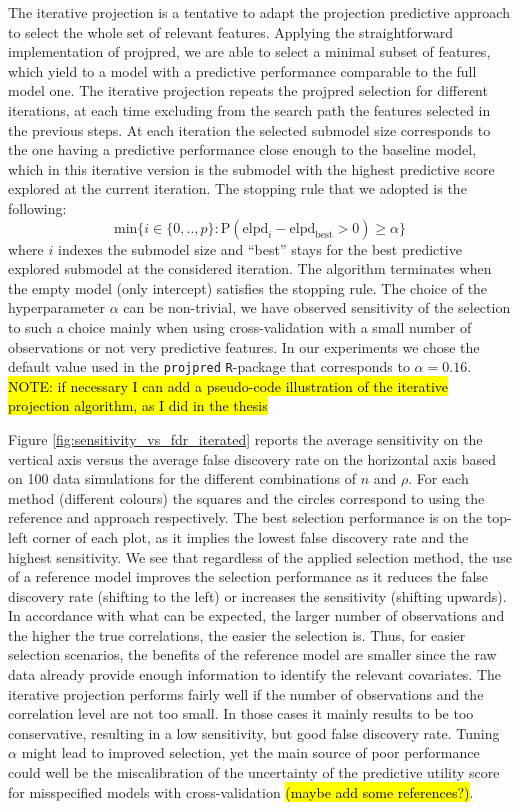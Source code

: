 \documentclass[american,]{article}
\theoremstyle{definition}
\begin{document}
The iterative projection is a tentative to adapt the projection predictive 
approach to select the whole set of relevant features. Applying the straightforward 
implementation of projpred, we are able to select a minimal subset of features, which
yield to a model with a predictive performance comparable to the full model one.
The iterative projection repeats the projpred selection for different iterations, at each time
excluding from the search path the features selected in the previous steps. At each iteration
the selected submodel size corresponds to the one having a predictive performance close enough
to the baseline model, which in this iterative version is the submodel with the highest predictive
score explored at the current iteration. The stopping rule that we adopted is the following:
\begin{equation} 
\label{eq:rule_of_thumb}
\text{min} \{i\in \{0,..,p\}: \text{P}(\text{elpd}_{i}-\text{elpd}_{\text{best}}>0)\geq \alpha \}
\end{equation}
where $i$ indexes the submodel size and ``best'' stays for the best predictive explored submodel
at the considered iteration. The algorithm terminates when the empty model (only intercept) satisfies
the stopping rule.
The choice of the hyperparameter $\alpha$ can be non-trivial, we have 
observed sensitivity of the selection to such a choice mainly when using cross-validation with a small
number of observations or not very predictive features. 
In our experiments we chose the default value used in the \texttt{projpred} 
\texttt{R}-package that corresponds to $\alpha=0.16$.
\hl{NOTE: if necessary I can add a pseudo-code illustration of the iterative projection algorithm, as 
I did in the thesis}


Figure \ref{fig:sensitivity_vs_fdr_iterated} reports the average sensitivity on
the vertical axis versus the average false discovery rate on the
horizontal axis based on 100 data simulations for the different
combinations of $n$ and $\rho$. For each method (different colours)
the squares and the circles correspond to using the reference and
approach respectively. The best selection performance is on the
top-left corner of each plot, as it implies the lowest false discovery
rate and the highest sensitivity. We see that regardless of the
applied selection method, the use of a reference model improves the
selection performance as it reduces the false discovery rate (shifting
to the left) or increases the sensitivity (shifting upwards). In
accordance with what can be expected, the larger number of
observations and the higher the true correlations, the easier the
selection is. Thus, for easier selection scenarios, the benefits of
the reference model are smaller since the raw data already provide
enough information to identify the relevant covariates. The iterative
projection performs fairly well if the number of observations and the correlation level
are not too small. In those cases it mainly results to be too conservative, resulting in a low
sensitivity, but good false discovery rate. Tuning $\alpha$ might lead to improved selection, yet
the main source of poor performance could well be the miscalibration of the uncertainty of the predictive
utility score for misspecified models with cross-validation \hl{(maybe add some references?)}.
\end{document}
